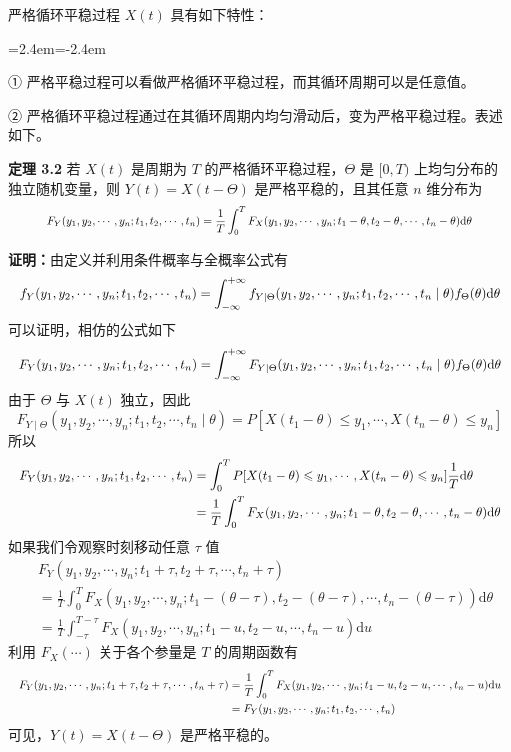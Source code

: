 \documentclass[11pt,openany,UTF8]{ctexbook}
\newcommand{\dif}{\mathrm{d}}                      %
\newcommand{\thm}[1]{\par\medskip\noindent\textbf{#1}\quad}
\newenvironment{citemize}
  {\begin{list}{}{\leftmargin=2.4em\itemindent=-2.4em\itemsep=1pt\topsep=3pt\parsep=0pt}}
  {\end{list}}
\begin{document}
严格循环平稳过程 $X(t)$ 具有如下特性\nobreak：
\begin{citemize}
\item ① 严格平稳过程可以看做严格循环平稳过程\nobreak，而其循环周期可以是任意值\nobreak。
\item ② 严格循环平稳过程通过在其循环周期内均匀滑动后\nobreak，变为严格平稳过程\nobreak。表述如下\nobreak。
\end{citemize}

\thm{定理 3.2} 若 $X(t)$ 是周期为 $T$ 的严格循环平稳过程\nobreak，$\Theta$ 是 $[0,T)$ 上均匀分布的独立随机变量\nobreak，则 $Y(t)=X(t-\Theta)$ 是严格平稳的\nobreak，且其任意 $n$ 维分布为
\begin{equation}
\resizebox{\dimexpr\linewidth-4em\relax}{!}{$\displaystyle
F_Y(y_1,y_2,\cdots,y_n;t_1,t_2,\cdots,t_n)=\frac{1}{T}\int_0^T F_X(y_1,y_2,\cdots,y_n;t_1-\theta,t_2-\theta,\cdots,t_n-\theta)\dif\theta$}
\label{eq:3.5}
\end{equation}

\textbf{证明\nobreak：}由定义并利用条件概率与全概率公式有
\[
\resizebox{\linewidth}{!}{$\displaystyle
f_Y(y_1,y_2,\cdots,y_n;t_1,t_2,\cdots,t_n)=\int_{-\infty}^{+\infty}f_{Y\mid\Theta}(y_1,y_2,\cdots,y_n;t_1,t_2,\cdots,t_n\mid\theta)f_\Theta(\theta)\dif\theta$}
\]
可以证明\nobreak，相仿的公式如下
\[
\resizebox{\linewidth}{!}{$\displaystyle
F_Y(y_1,y_2,\cdots,y_n;t_1,t_2,\cdots,t_n)=\int_{-\infty}^{+\infty}F_{Y\mid\Theta}(y_1,y_2,\cdots,y_n;t_1,t_2,\cdots,t_n\mid\theta)f_\Theta(\theta)\dif\theta$}
\]
由于 $\Theta$ 与 $X(t)$ 独立\nobreak，因此
\[
F_{Y\mid\Theta}(y_1,y_2,\cdots,y_n;t_1,t_2,\cdots,t_n\mid\theta)=P[X(t_1-\theta)\leqslant y_1,\cdots,X(t_n-\theta)\leqslant y_n]
\]
所以
\[
\resizebox{\linewidth}{!}{$\displaystyle
\begin{aligned}
F_Y(y_1,y_2,\cdots,y_n;t_1,t_2,\cdots,t_n)&=\int_0^T P[X(t_1-\theta)\leqslant y_1,\cdots,X(t_n-\theta)\leqslant y_n]\frac{1}{T}\dif\theta\\
&=\frac{1}{T}\int_0^T F_X(y_1,y_2,\cdots,y_n;t_1-\theta,t_2-\theta,\cdots,t_n-\theta)\dif\theta
\end{aligned}$}
\]
如果我们令观察时刻移动任意 $\tau$ 值
\[
\begin{aligned}
&F_Y(y_1,y_2,\cdots,y_n;t_1+\tau,t_2+\tau,\cdots,t_n+\tau)\\
&=\frac{1}{T}\int_0^T F_X(y_1,y_2,\cdots,y_n;t_1-(\theta-\tau),t_2-(\theta-\tau),\cdots,t_n-(\theta-\tau))\dif\theta\\
&=\frac{1}{T}\int_{-\tau}^{T-\tau} F_X(y_1,y_2,\cdots,y_n;t_1-u,t_2-u,\cdots,t_n-u)\dif u
\end{aligned}
\]
利用 $F_X(\cdots)$ 关于各个参量是 $T$ 的周期函数有
\[
\resizebox{\linewidth}{!}{$\displaystyle
\begin{aligned}
F_Y(y_1,y_2,\cdots,y_n;t_1+\tau,t_2+\tau,\cdots,t_n+\tau)&=\frac{1}{T}\int_0^T F_X(y_1,y_2,\cdots,y_n;t_1-u,t_2-u,\cdots,t_n-u)\dif u\\
&=F_Y(y_1,y_2,\cdots,y_n;t_1,t_2,\cdots,t_n)
\end{aligned}$}
\]
可见\nobreak，$Y(t)=X(t-\Theta)$ 是严格平稳的\nobreak。
\end{document}
